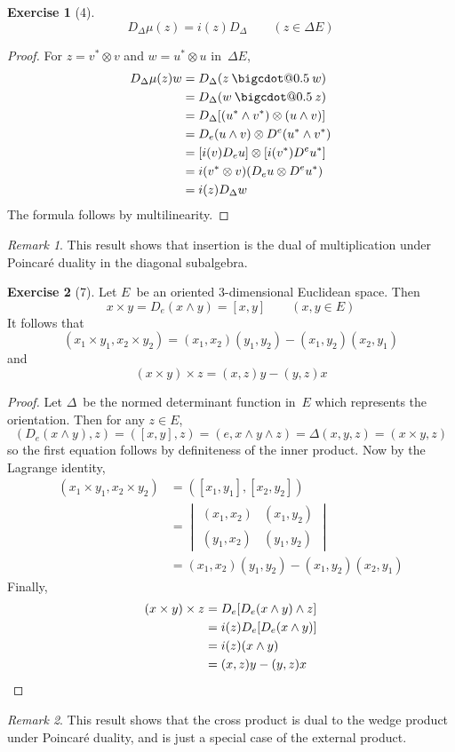 \documentclass[letterpaper,12pt]{article}
\makeatletter
\newcommand{\bigcdot}[1]{\mathbin{\mathpalette\bigcdot@{#1}}}
\newcommand{\bigcdot@}[2]{%
  \sbox0{$#1\vcenter{}$}%
  \sbox2{$#1\cdot\m@th$}%
  \hbox{%
    \hfil
    \raise\ht0\hbox{%
      \scalebox{#2}{%
        \lower\ht0\hbox{$#1\bullet\m@th$}%
      }%
    }%
    \hfil
  }%
}
\newcommand{\cross}{\times}
\newcommand{\tprod}{\otimes}
\newcommand{\eprod}{\wedge}
\newcommand{\mprod}{\bigcdot{0.5}}
\newcommand{\iprod}[2]{(#1,#2)}
\theoremstyle{definition}
\newtheorem*{exer}{Exercise}
\theoremstyle{remark}
\newtheorem*{rmk}{Remark}
\makeatother
\begin{document}
\begin{exer}[4]
\[D_{\Delta}\mu(z)=i(z)D_{\Delta}\qquad(z\in\Delta E)\]
\end{exer}
\begin{proof}
For \(z=v^*\tprod v\) and \(w=u^*\tprod u\) in~\(\Delta E\),
\begin{align*}
D_{\Delta}\mu(z)w&=D_{\Delta}(z\mprod w)\\
	&=D_{\Delta}(w\mprod z)\\
	&=D_{\Delta}[(u^*\eprod v^*)\tprod(u\eprod v)]\\
	&=D_e(u\eprod v)\tprod D^e(u^*\eprod v^*)\\
	&=[i(v)D_e u]\tprod[i(v^*)D^e u^*]\\
	&=i(v^*\tprod v)(D_e u\tprod D^e u^*)\\
	&=i(z)D_{\Delta}w
\end{align*}
The formula follows by multilinearity.
\end{proof}
\begin{rmk}
This result shows that insertion is the dual of multiplication under Poincar\'e duality in the diagonal subalgebra.
\end{rmk}

\begin{exer}[7]
Let \(E\)~be an oriented \(3\)-dimensional Euclidean space. Then
\[x\cross y=D_e(x\eprod y)=[x,y]\qquad(x,y\in E)\]
It follows that
\[\iprod{x_1\cross y_1}{x_2\cross y_2}=\iprod{x_1}{x_2}\iprod{y_1}{y_2}-\iprod{x_1}{y_2}\iprod{x_2}{y_1}\]
and
\[(x\cross y)\cross z=\iprod{x}{z}y-\iprod{y}{z}x\]
\end{exer}
\begin{proof}
Let \(\Delta\)~be the normed determinant function in~\(E\) which represents the orientation. Then for any \(z\in E\),
\[\iprod{D_e(x\eprod y)}{z}=\iprod{[x,y]}{z}=\iprod{e}{x\eprod y\eprod z}=\Delta(x,y,z)=\iprod{x\cross y}{z}\]
so the first equation follows by definiteness of the inner product. Now by the Lagrange identity,
\begin{align*}
\iprod{x_1\cross y_1}{x_2\cross y_2}&=\iprod{[x_1,y_1]}{[x_2,y_2]}\\
	&=\begin{vmatrix}\iprod{x_1}{x_2}&\iprod{x_1}{y_2}\\\iprod{y_1}{x_2}&\iprod{y_1}{y_2}\end{vmatrix}\\
	&=\iprod{x_1}{x_2}\iprod{y_1}{y_2}-\iprod{x_1}{y_2}\iprod{x_2}{y_1}
\end{align*}
Finally,
\begin{align*}
(x\cross y)\cross z&=D_e[D_e(x\eprod y)\eprod z]\\
	&=i(z)D_e[D_e(x\eprod y)]\\
	&=i(z)(x\eprod y)\\
	&=\iprod{x}{z}y-\iprod{y}{z}x\qedhere
\end{align*}
\end{proof}
\begin{rmk}
This result shows that the cross product is dual to the wedge product under Poincar\'e duality, and is just a special case of the external product.
\end{rmk}
\end{document}
